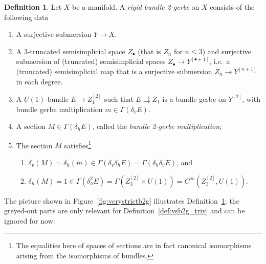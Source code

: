 \documentclass[12pt]{amsart}
\theoremstyle{plain}
\theoremstyle{definition}
\newtheorem{definition}[theorem]{Definition}
\theoremstyle{remark}
\numberwithin{equation}{section}
\newcommand{\<}{\langle}
\renewcommand{\>}{\rangle}
\begin{document}
\begin{definition}\label{def:vstrictb2g}
Let $X$ be a manifold. 
A \emph{rigid bundle 2-gerbe} on $X$ consists of the following data
\begin{enumerate}[(1)]

  \item A surjective submersion $Y \to X$.
  
  \item A 3-truncated semisimplicial space $Z_\bullet$ (that is $Z_n$ for $n\leq 3$) and surjective submersion of (truncated) semisimplicial spaces $Z_\bullet \to Y^{[\bullet+1]}$, i.e.\ a (truncated) semisimplicial map that is a surjective submersion $Z_n \to Y^{[n+1]}$ in each degree.

  \item A $U(1)$-bundle $E\to Z_1^{[2]}$ such that $E \rightrightarrows Z_1$ is a bundle gerbe on $Y^{[2]}$, with bundle gerbe multiplication $m\in \Gamma(\delta_vE)$.

  \item\label{b2g:mult}
   A section $M\in \Gamma(\delta_hE)$, called the \emph{bundle 2-gerbe multiplication};
   
   \item The section $M$ satisfies\footnote{The equalities here of spaces of sections are in fact canonical isomorphisms arising from the isomorphisms of bundles.} 
   \begin{enumerate}
      \item $\delta_v(M) = \delta_h(m)\in \Gamma(\delta_v\delta_hE) = \Gamma(\delta_h\delta_vE)$, and
      \item $\delta_h(M) = 1\in \Gamma(\delta_h^2E) = \Gamma(Z_3^{[2]}\times U(1)) = C^\infty(Z_3^{[2]}, U(1))$.
    \end{enumerate} 
\end{enumerate}

\end{definition}

The picture shown in Figure~\ref{fig:verystrictb2g} illustrates Definition~\ref{def:vstrictb2g}; the greyed-out parts are only relevant for Definition~\ref{def:vsb2g_triv} and can be ignored for now.
\end{document}
